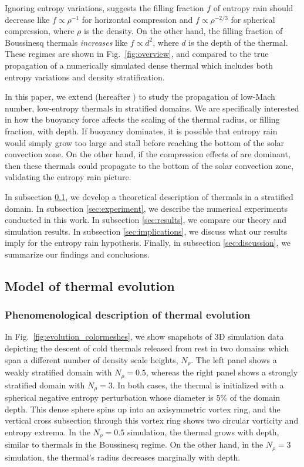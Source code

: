 Ignoring entropy variations, \citet{brandenburg2016} suggests the filling fraction $f$ of entropy rain should decrease like $f \propto \rho^{-1}$ for horizontal compression and $f \propto \rho^{-2/3}$ for spherical compression, where $\rho$ is the density.
On the other hand, the filling fraction of Boussinesq thermals \emph{increases} like $f \propto d^2$, where $d$ is the depth of the thermal.
These regimes are shown in Fig.~\ref{fig:overview}, and compared to the true propagation of a numerically simulated dense thermal which includes both entropy variations and density stratification.

In this paper, we extend \citet{lecoanet&jeevanjee2018} (hereafter \LJ) to study the propagation of low-Mach number, low-entropy thermals in stratified domains. 
We are specifically interested in how the buoyancy force affects the scaling of the thermal radius, or filling fraction, with depth. 
If buoyancy dominates, it is possible that entropy rain would simply grow too large and stall before reaching the bottom of the solar convection zone.
On the other hand, if the compression effects of \citet{brandenburg2016} are dominant, then these thermals could propagate to the bottom of the solar convection zone, validating the entropy rain picture.

In subsection \ref{sec:theory}, we develop a theoretical description of thermals in a stratified domain. 
In subsection \ref{sec:experiment}, we describe the numerical experiments conducted in this work. 
In subsection \ref{sec:results}, we compare our theory and simulation results. 
In subsection \ref{sec:implications}, we discuss what our results imply for the entropy rain hypothesis.
Finally, in subsection \ref{sec:discussion}, we summarize our findings and conclusions.

\subsection{Model of thermal evolution}
\label{sec:theory}

\subsubsection{Phenomenological description of thermal evolution}
In Fig.~\ref{fig:evolution_colormeshes}, we show snapshots of 3D simulation data depicting the descent of cold thermals released from rest in two domains which span a different number of density scale heights, $N_\rho$.
The left panel shows a weakly stratified domain with $N_\rho=0.5$, whereas the right panel shows a strongly stratified domain with $N_\rho=3$.
In both cases, the thermal is initialized with a spherical negative entropy perturbation whose diameter is 5\% of the domain depth.
This dense sphere spins up into an axisymmetric vortex ring, and the vertical cross subsection through this vortex ring shows two circular vorticity and entropy extrema.
In the $N_\rho = 0.5$ simulation, the thermal grows with depth, similar to thermals in the Boussinesq regime.
On the other hand, in the $N_\rho = 3$ simulation, the thermal's radius decreases marginally with depth.

